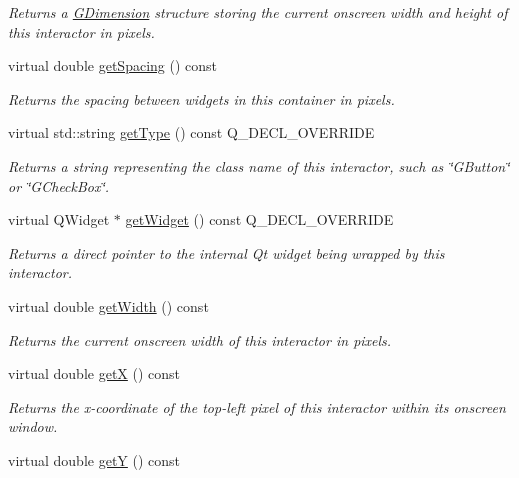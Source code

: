 \begin{DoxyCompactItemize}
\begin{DoxyCompactList}\small\item\em Returns a \mbox{\hyperlink{classGDimension}{G\+Dimension}} structure storing the current onscreen width and height of this interactor in pixels. \end{DoxyCompactList}\item 
virtual double \mbox{\hyperlink{classGContainer_a9a7e859eeff5cc7de46d65b9be7afc3c}{get\+Spacing}} () const
\begin{DoxyCompactList}\small\item\em Returns the spacing between widgets in this container in pixels. \end{DoxyCompactList}\item 
virtual std\+::string \mbox{\hyperlink{classGContainer_a9896d58fcfebbf1025aeeb5b8b9ede80}{get\+Type}} () const Q\+\_\+\+D\+E\+C\+L\+\_\+\+O\+V\+E\+R\+R\+I\+DE
\begin{DoxyCompactList}\small\item\em Returns a string representing the class name of this interactor, such as \char`\"{}\+G\+Button\char`\"{} or \char`\"{}\+G\+Check\+Box\char`\"{}. \end{DoxyCompactList}\item 
virtual Q\+Widget $\ast$ \mbox{\hyperlink{classGContainer_a326ee51b5561f807df7b29a1c101f7fd}{get\+Widget}} () const Q\+\_\+\+D\+E\+C\+L\+\_\+\+O\+V\+E\+R\+R\+I\+DE
\begin{DoxyCompactList}\small\item\em Returns a direct pointer to the internal Qt widget being wrapped by this interactor. \end{DoxyCompactList}\item 
virtual double \mbox{\hyperlink{classGInteractor_a0ed2965abd4f5701d2cadf71239faf19}{get\+Width}} () const
\begin{DoxyCompactList}\small\item\em Returns the current onscreen width of this interactor in pixels. \end{DoxyCompactList}\item 
virtual double \mbox{\hyperlink{classGInteractor_a344385751bee0720059403940d57a13e}{getX}} () const
\begin{DoxyCompactList}\small\item\em Returns the x-\/coordinate of the top-\/left pixel of this interactor within its onscreen window. \end{DoxyCompactList}\item 
virtual double \mbox{\hyperlink{classGInteractor_aafa51c7f8f38a09febbb9ce7853f77b4}{getY}} () const

\end{DoxyCompactItemize}
